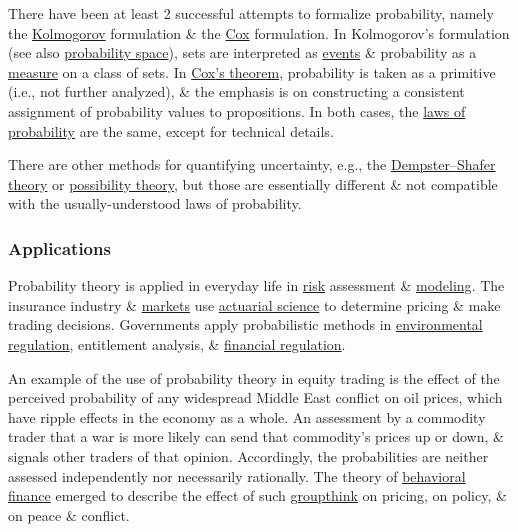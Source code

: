 \documentclass{article}
\begin{document}
There have been at least 2 successful attempts to formalize probability, namely the \href{https://en.wikipedia.org/wiki/Kolmogorov}{\sc Kolmogorov} formulation \& the \href{https://en.wikipedia.org/wiki/Richard_Threlkeld_Cox}{\sc Cox} formulation. In {\sc Kolmogorov}'s formulation (see also \href{https://en.wikipedia.org/wiki/Probability_space}{probability space}), sets are interpreted as \href{https://en.wikipedia.org/wiki/Event_(probability_theory)}{events} \& probability as a \href{https://en.wikipedia.org/wiki/Measure_(mathematics)}{measure} on a class of sets. In \href{https://en.wikipedia.org/wiki/Cox%27s_theorem}{{\sc Cox}'s theorem}, probability is taken as a primitive (i.e., not further analyzed), \& the emphasis is on constructing a consistent assignment of probability values to propositions. In both cases, the \href{https://en.wikipedia.org/wiki/Probability_axioms}{laws of probability} are the same, except for technical details.

There are other methods for quantifying uncertainty, e.g., the \href{https://en.wikipedia.org/wiki/Dempster%E2%80%93Shafer_theory}{Dempster--Shafer theory} or \href{https://en.wikipedia.org/wiki/Possibility_theory}{possibility theory}, but those are essentially different \& not compatible with the usually-understood laws of probability.

\subsubsection{Applications}
Probability theory is applied in everyday life in \href{https://en.wikipedia.org/wiki/Risk}{risk} assessment \& \href{https://en.wikipedia.org/wiki/Statistical_model}{modeling}. The insurance industry \& \href{https://en.wikipedia.org/wiki/Market_(economics)}{markets} use \href{https://en.wikipedia.org/wiki/Actuarial_science}{actuarial science} to determine pricing \& make trading decisions. Governments apply probabilistic methods in \href{https://en.wikipedia.org/wiki/Environmental_regulation}{environmental regulation}, entitlement analysis, \& \href{https://en.wikipedia.org/wiki/Financial_regulation}{financial regulation}.

An example of the use of probability theory in equity trading is the effect of the perceived probability of any widespread Middle East conflict on oil prices, which have ripple effects in the economy as a whole. An assessment by a commodity trader that a war is more likely can send that commodity's prices up or down, \& signals other traders of that opinion. Accordingly, the probabilities are neither assessed independently nor necessarily rationally. The theory of \href{https://en.wikipedia.org/wiki/Behavioral_finance}{behavioral finance} emerged to describe the effect of such \href{https://en.wikipedia.org/wiki/Groupthink}{groupthink} on pricing, on policy, \& on peace \& conflict.
\end{document}
